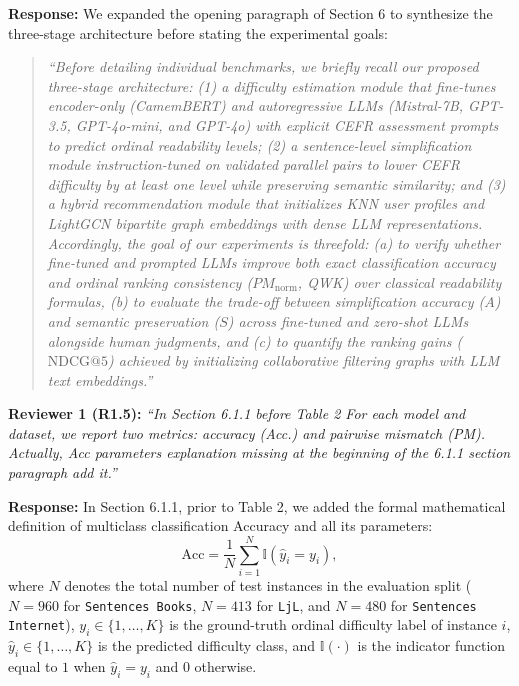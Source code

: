 \documentclass[11pt,a4paper]{article}
\begin{document}
\noindent\textbf{Response:}
We expanded the opening paragraph of Section 6 to synthesize the three-stage architecture before stating the experimental goals:
\begin{quote}
\textit{``Before detailing individual benchmarks, we briefly recall our proposed three-stage architecture: (1) a difficulty estimation module that fine-tunes encoder-only (CamemBERT) and autoregressive LLMs (Mistral-7B, GPT-3.5, GPT-4o-mini, and GPT-4o) with explicit CEFR assessment prompts to predict ordinal readability levels; (2) a sentence-level simplification module instruction-tuned on validated parallel pairs to lower CEFR difficulty by at least one level while preserving semantic similarity; and (3) a hybrid recommendation module that initializes KNN user profiles and LightGCN bipartite graph embeddings with dense LLM representations. Accordingly, the goal of our experiments is threefold: (a) to verify whether fine-tuned and prompted LLMs improve both exact classification accuracy and ordinal ranking consistency ($PM_{\text{norm}}$, QWK) over classical readability formulas, (b) to evaluate the trade-off between simplification accuracy ($A$) and semantic preservation ($S$) across fine-tuned and zero-shot LLMs alongside human judgments, and (c) to quantify the ranking gains ($\text{NDCG}@5$) achieved by initializing collaborative filtering graphs with LLM text embeddings.''}
\end{quote}

\begin{reviewbox}
\textbf{Reviewer 1 (R1.5):} \textit{``In Section 6.1.1 before Table 2 For each model and dataset, we report two metrics: accuracy (Acc.) and pairwise mismatch (PM). Actually, Acc parameters explanation missing at the beginning of the 6.1.1 section paragraph add it.''}
\end{reviewbox}

\noindent\textbf{Response:}
In Section 6.1.1, prior to Table 2, we added the formal mathematical definition of multiclass classification Accuracy and all its parameters:
\begin{equation}
\text{Acc} = \frac{1}{N} \sum_{i=1}^{N} \mathbb{I}(\hat{y}_i = y_i),
\label{eq:rebuttal_accuracy}
\end{equation}
where $N$ denotes the total number of test instances in the evaluation split ($N = 960$ for \texttt{Sentences Books}, $N = 413$ for \texttt{LjL}, and $N = 480$ for \texttt{Sentences Internet}), $y_i \in \{1, \dots, K\}$ is the ground-truth ordinal difficulty label of instance $i$, $\hat{y}_i \in \{1, \dots, K\}$ is the predicted difficulty class, and $\mathbb{I}(\cdot)$ is the indicator function equal to $1$ when $\hat{y}_i = y_i$ and $0$ otherwise.
\end{document}
